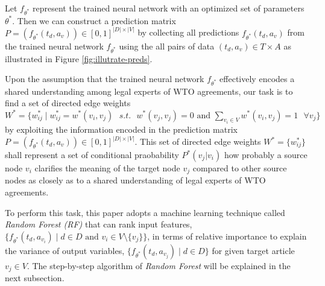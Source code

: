 Let $f_{\theta^*}$ represent the trained neural network with an optimized set of parameters $\theta^*$. 
Then we can construct a prediction matrix $P = (f_{\theta^*}(t_d, a_v)) \in [0,1]^{{|D| \times |V|}}$  by collecting all predictions $f_{\theta^*}(t_d, a_v)$ from the trained neural network $f_{\theta^{*}}$ using the all pairs of data $(t_d,a_v) \in T \times A$ as illustrated in Figure \ref{fig:illutrate-preds}.

Upon the assumption that the trained neural network $f_{\theta^*}$ effectively encodes a shared understanding among legal experts of WTO agreements, our task is to find a set of directed edge weights $W^* = \{w^{*}_{ij} \mid w^{*}_{ij} = w^{*}(v_i, v_j) \text{ } s.t. \text{ } w^{*}(v_j, v_j) = 0 \text{ and } \sum_{v_i\in V}{w^{*}(v_i, v_j)} = 1 \text{ } \forall v_j \}$ %
by exploiting the information encoded in the prediction matrix $P = (f_{\theta^*}(t_d, a_v)) \in [0,1]^{{|D| \times |V|}}$. This set of directed edge weights $W^{*} = \{w^{*}_{ij}\}$ shall represent a set of conditional praobability $P^{*}(v_j|v_i)$ how probably a source node $v_i$ clarifies the meaning of the target node $v_j$ compared to other source nodes
as closely as to a shared understanding of legal experts of WTO agreements.

To perform this task, this paper adopts a machine learning technique called \textit{Random Forest (RF)} that can rank input features, $\{f_{\theta^*}(t_d, a_{v_i}) \mid d \in D \text{ and } v_i \in V \setminus \{v_j\}\}$,  in terms of relative importance to explain the variance of output variables, $\{f_{\theta^*}(t_d, a_{v_j}) \mid d \in D \}$ for given target article $v_j \in V$. The step-by-step algorithm of \textit{Random Forest} will be explained in the next subsection.






